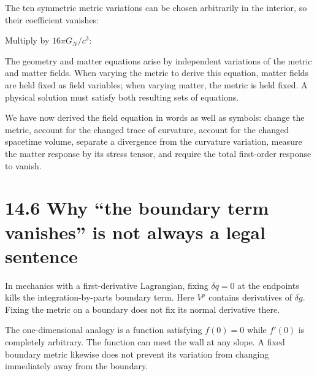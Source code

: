 \documentclass[
  11pt,
  letterpaper,
  oneside,
  openany]{scrbook}
\begin{document}
The ten symmetric metric variations can be chosen arbitrarily in the
interior, so their coefficient vanishes:

\begin{center}
\begingroup
{}
\ifdim\wd\grmathbox>\linewidth
\resizebox{\linewidth}{!}{\usebox{\grmathbox}}
\else\usebox{\grmathbox}\fi
\endgroup
\end{center}

Multiply by \(16\pi G_N/c^3\):

\begin{center}
\begingroup
{}
\ifdim\wd\grmathbox>\linewidth
\resizebox{\linewidth}{!}{\usebox{\grmathbox}}
\else\usebox{\grmathbox}\fi
\endgroup
\end{center}

The geometry and matter equations arise by independent variations of the
metric and matter fields. When varying the metric to derive this
equation, matter fields are held fixed as field variables; when varying
matter, the metric is held fixed. A physical solution must satisfy both
resulting sets of equations.

We have now derived the field equation in words as well as symbols:
change the metric, account for the changed trace of curvature, account
for the changed spacetime volume, separate a divergence from the
curvature variation, measure the matter response by its stress tensor,
and require the total first-order response to vanish.

\hypertarget{why-the-boundary-term-vanishes-is-not-always-a-legal-sentence}{%
\section{14.6 Why ``the boundary term vanishes'' is not always a legal
sentence}\label{why-the-boundary-term-vanishes-is-not-always-a-legal-sentence}}

In mechanics with a first-derivative Lagrangian, fixing \(\delta q=0\)
at the endpoints kills the integration-by-parts boundary term. Here
\(V^\rho\) contains derivatives of \(\delta g\). Fixing the metric on a
boundary does not fix its normal derivative there.

The one-dimensional analogy is a function satisfying \(f(0)=0\) while
\(f'(0)\) is completely arbitrary. The function can meet the wall at any
slope. A fixed boundary metric likewise does not prevent its variation
from changing immediately away from the boundary.
\end{document}
